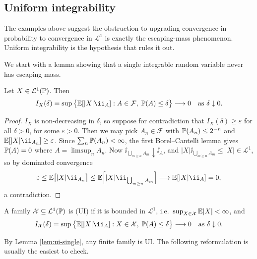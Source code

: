 \documentclass[a4paper]{scrartcl}
\newcommand{\cF}{\mathcal{F}}
\newcommand{\cL}{\mathcal{L}}
\newcommand{\cX}{\mathcal{X}}
\newcommand{\ind}{\ii}
\begin{document}
\subsection{Uniform integrability}

The examples above suggest the obstruction to upgrading convergence in probability to convergence in $\cL^1$ is exactly the escaping-mass phenomenon. Uniform integrability is the hypothesis that rules it out.

We start with a lemma showing that a single integrable random variable never has escaping mass.

\begin{lemma}\label{lem:ui-single}
	Let $X \in \cL^1(\PP)$. Then
	$$
	I_X(\delta) = \sup\big\{ \EE[|X|\ind_A] : A \in \cF, \; \PP(A)\leq\delta\big\} \longrightarrow 0 \quad \text{as } \delta \downarrow 0.
	$$
\end{lemma}
\begin{proof}
	$I_X$ is non-decreasing in $\delta$, so suppose for contradiction that $I_X(\delta) \geq \varepsilon$ for all $\delta>0$, for some $\varepsilon>0$. Then we may pick $A_n \in \cF$ with $\mathbb{P}(A_n) \leq 2^{-n}$ and $\EE[|X|\ind_{A_n}]\geq\varepsilon$. Since $\sum_n\mathbb{P}(A_n)<\infty$, the first Borel--Cantelli lemma gives $\mathbb{P}(A)=0$ where $A = \limsup_n A_n$. Now $\ind_{\bigcup_{m\geq n}A_m}\downarrow \ind_A$, and $|X|\ind_{\bigcup_{m\geq n}A_m}\leq|X|\in\cL^1$, so by dominated convergence
	$$
	\varepsilon \leq \EE\big[|X|\ind_{A_n}\big] \leq \EE\Big[|X|\ind_{\bigcup_{m\geq n}A_m}\Big] \longrightarrow \EE[|X|\ind_A] = 0,
	$$
	a contradiction.
\end{proof}

\begin{definition}
	A family $\cX \subseteq \cL^1(\PP)$ is  (UI) if it is bounded in $\cL^1$, i.e.\ $\sup_{X\in\cX}\EE|X|<\infty$, and
	$$
	I_\cX(\delta) = \sup\big\{ \EE[|X|\ind_A] : X \in \cX, \; \PP(A)\leq\delta\big\} \longrightarrow 0 \quad \text{as } \delta\downarrow 0.
	$$
\end{definition}

By Lemma \ref{lem:ui-single}, any finite family is UI. The following reformulation is usually the easiest to check.
\end{document}
